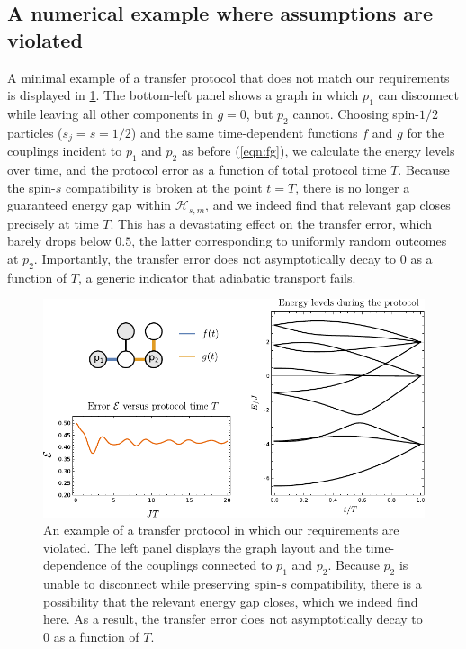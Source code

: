 \subsection{A numerical example where assumptions are violated}
A minimal example of a transfer protocol that does not match our requirements is displayed in \cref{fig:elevelsfail}. The bottom-left panel shows a graph in which $p_1$ can disconnect while leaving all other components in $g=0$, but $p_2$ cannot. Choosing spin-$1/2$ particles ($s_j = s = 1/2$) and the same time-dependent functions $f$ and $g$ for the couplings incident to $p_1$ and $p_2$ as before (\cref{eqn:fg}), we calculate the energy levels over time, and the protocol error as a function of total protocol time $T$. Because the spin-$s$ compatibility is broken at the point $t=T$, there is no longer a guaranteed energy gap within $\mathcal{H}_{s,m}$, and we indeed find that relevant gap closes precisely at time $T$. This has a devastating effect on the transfer error, which barely drops below $0.5$, the latter corresponding to uniformly random outcomes at $p_2$. Importantly, the transfer error does not asymptotically decay to $0$ as a function of $T$, a generic indicator that adiabatic transport fails. 

\begin{figure}
\centering
\includegraphics[width=.87\textwidth]{img_manuscript/pltProtocolFail_larger.pdf} 
\caption{An example of a transfer protocol in which our requirements are violated. The left panel displays the graph layout and the time-dependence of the couplings connected to $p_1$ and $p_2$. Because $p_2$ is unable to disconnect while preserving spin-$s$ compatibility, there is a possibility that the relevant energy gap closes, which we indeed find here. As a result, the transfer error does not asymptotically decay to 0 as a function of $T$.}
\label{fig:elevelsfail}
\end{figure}





